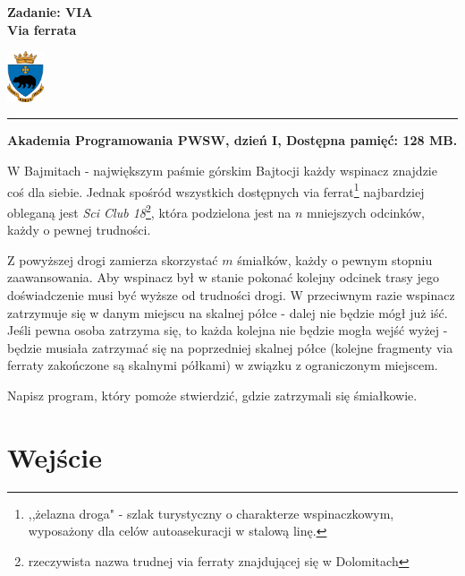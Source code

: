 \documentclass[10pt]{article}
\begin{document}
    

    \noindent
    \begin{minipage}{0.5\textwidth}
        \LARGE{\textsf{\textbf{Zadanie: VIA\\Via ferrata}}}
    \end{minipage}
    \begin{minipage}{0.5\textwidth}
        \begin{flushright}
            \includegraphics[height=1.5cm]{logo.jpg}
        \end{flushright}
    \end{minipage}
    
    \noindent\rule{\textwidth}{0.4pt}
    
    \noindent\textbf{Akademia Programowania PWSW, dzień I, Dostępna pamięć: 128 MB.}
    \vspace{1em}
    
    
    \noindent
    W Bajmitach - największym paśmie górskim Bajtocji każdy wspinacz znajdzie coś dla siebie. Jednak spośród wszystkich dostępnych via ferrat\footnote{,,żelazna droga" - szlak turystyczny o charakterze wspinaczkowym, wyposażony dla celów autoasekuracji w stalową linę.} najbardziej obleganą jest \textit{Sci Club 18}\footnote{rzeczywista nazwa trudnej via ferraty znajdującej się w Dolomitach}, która podzielona jest na $n$ mniejszych odcinków, każdy o pewnej trudności. 

    Z powyższej drogi zamierza skorzystać $m$ śmiałków, każdy o pewnym stopniu zaawansowania. Aby wspinacz był w stanie pokonać kolejny odcinek trasy jego doświadczenie musi być wyższe od trudności drogi. W przeciwnym razie wspinacz zatrzymuje się w danym miejscu na skalnej półce - dalej nie będzie mógł już iść. Jeśli pewna osoba zatrzyma się, to każda kolejna nie będzie mogła wejść wyżej - będzie musiała zatrzymać się na poprzedniej skalnej półce (kolejne fragmenty via ferraty zakończone są skalnymi półkami) w związku z ograniczonym miejscem.

    Napisz program, który pomoże stwierdzić, gdzie zatrzymali się śmiałkowie.


    \section*{Wejście}
    
\end{document}
